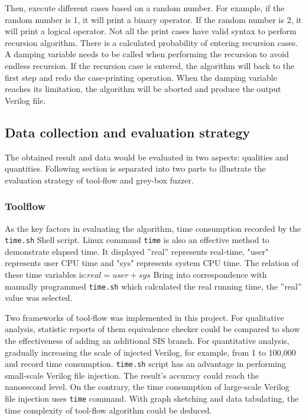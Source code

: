 Then, execute different cases based on a random number. For example, if the random number is 1, it will print a binary operator. If the random number is 2, it will print a logical operator. Not all the print cases have valid syntax to perform recursion algorithm. There is a calculated probability of entering recursion cases. A damping variable needs to be called when performing the recursion to avoid endless recursion. If the recursion case is entered, the algorithm will back to the first step and redo the case-printing operation. When the damping variable reaches its limitation, the algorithm will be aborted and produce the output Verilog file.

\subsection{Data collection and evaluation strategy}
The obtained result and data would be evaluated in two aspects: qualities and quantities. Following section is separated into two parts to illustrate the evaluation strategy of tool-flow and grey-box fuzzer.

\subsubsection{Toolflow}
As the key factors in evaluating the algorithm, time consumption recorded by the \texttt{time.sh} Shell script. Linux command \texttt{time} is also an effective method to demonstrate elapsed time. It displayed ''real'' represents real-time, "user" represents user CPU time and "sys" represents system CPU time. The relation of these time variables is:$real = user + sys$
Bring into correspondence with manually programmed \texttt{time.sh} which calculated the real running time, the ''real'' value was selected. 

Two frameworks of tool-flow was implemented in this project. For qualitative analysis, statistic reports of them equivalence checker could be compared to show the effectiveness of adding an additional SIS branch. For quantitative analysis, gradually increasing the scale of injected Verilog, for example, from 1 to 100,000 and record time consumption. \texttt{time.sh} script has an advantage in performing small-scale Verilog file injection. The result's accuracy could reach the nanosecond level. On the contrary, the time consumption of large-scale Verilog file injection uses \texttt{time} command. With graph sketching and data tabulating, the time complexity of tool-flow algorithm could be deduced.  

